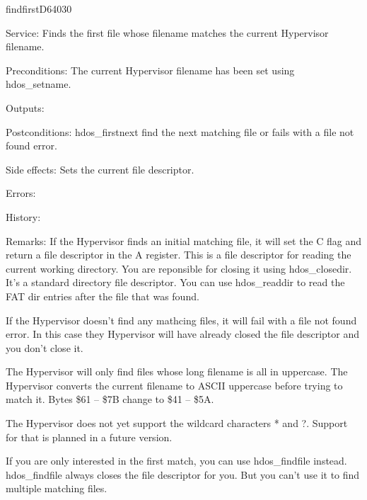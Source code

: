 %
\newpage
\begin{hyppotrap}{findfirst}{D640}{30}
\item [Service:]
  Finds the first file whose filename matches the current Hypervisor filename.
\item [Preconditions:]
  The current Hypervisor filename has been set using hdos\_setname.
\item [Outputs:]
\item [Postconditions:]
  hdos\_firstnext find the next matching file or fails with a file not found
  error.
\item [Side effects:]
  Sets the current file descriptor.
\item [Errors:]
\item [History:]
\item [Remarks:]
  If the Hypervisor finds an initial matching file, it will set the C flag and
  return a file descriptor in the A register. This is a file descriptor for
  reading the current working directory. You are reponsible for closing it using
  hdos\_closedir. It's a standard directory file descriptor. You can use
  hdos\_readdir to read the FAT dir entries after the file that was found.

  If the Hypervisor doesn't find any mathcing files, it will fail with a file
  not found error. In this case they Hypervisor will have already closed the
  file descriptor and you don't close it.

  The Hypervisor will only find files whose long filename is all in uppercase.
  The Hypervisor converts the current filename to ASCII uppercase before trying
  to match it. Bytes \$61 -- \$7B change to \$41 -- \$5A.

  The Hypervisor does not yet support the wildcard characters * and ?. Support
  for that is planned in a future version.

  If you are only interested in the first match, you can use hdos\_findfile
  instead. hdos\_findfile always closes the file descriptor for you. But you
  can't use it to find multiple matching files.
\end{hyppotrap}


